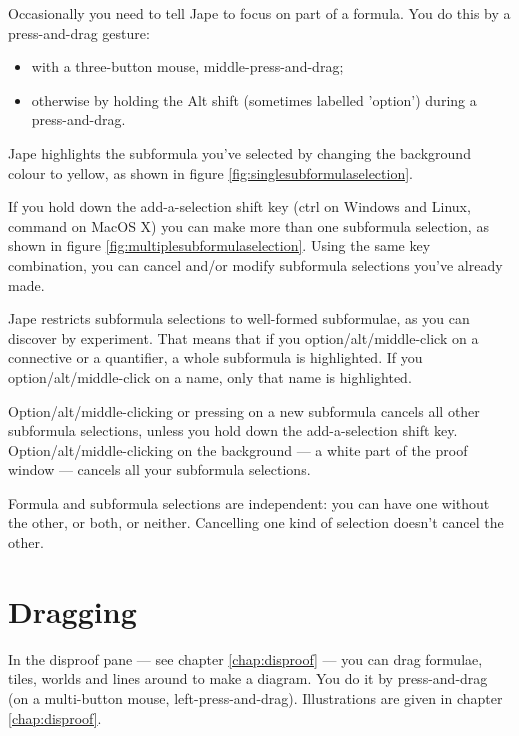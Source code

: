 \documentclass[11pt]{book}
\newcommand{\figref}[1]{figure \ref{fig:#1}}
\newcommand{\chapref}[1]{chapter \ref{chap:#1}}
\begin{document}
Occasionally you need to tell Jape to focus on part of a formula. You do this by a press-and-drag gesture:
\begin{itemize}
\item with a three-button mouse, middle-press-and-drag;
\item otherwise by holding the Alt shift (sometimes labelled 'option') during a press-and-drag.
\end{itemize}
Jape highlights the subformula you've selected by changing the background colour to yellow, as shown in \figref{singlesubformulaselection}. 

If you hold down the add-a-selection shift key (ctrl on Windows and Linux, command on MacOS X) you can make more than one subformula selection, as shown in \figref{multiplesubformulaselection}. Using the same key combination, you can cancel and/or modify subformula selections you've already made.

Jape restricts subformula selections to well-formed subformulae, as you can discover by experiment. That means that if you option/alt/middle-click on a connective or a quantifier, a whole subformula is highlighted. If you option/alt/middle-click on a name, only that name is highlighted.

Option/alt/middle-clicking or pressing on a new subformula cancels all other subformula selections, unless you hold down the add-a-selection shift key. Option/alt/middle-clicking on the background --- a white part of the proof window --- cancels all your subformula selections.

Formula and subformula selections are independent: you can have one without the other, or both, or neither. Cancelling one kind of selection doesn't cancel the other. 

\section{Dragging}

In the disproof pane --- see \chapref{disproof} --- you can drag formulae, tiles, worlds and lines around to make a diagram. You do it by press-and-drag (on a multi-button mouse, left-press-and-drag). Illustrations are given in \chapref{disproof}.
\end{document}
